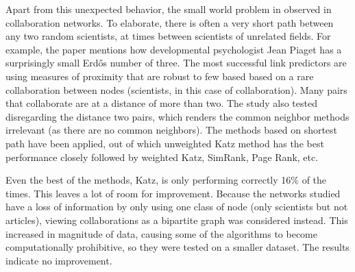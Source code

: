 \documentclass[11pt]{article}
\begin{document}
Apart from this unexpected behavior, the small world problem in observed in collaboration networks. To elaborate, there is often a very short path between any two random scientists, at times between scientists of unrelated fields. For example, the paper mentions how developmental psychologist Jean Piaget has a surprisingly small Erd\H{o}s number of three. The most successful link predictors are using measures of proximity that are robust to few based based on a rare collaboration between nodes (scientists, in this case of collaboration). Many pairs that collaborate are at a distance of more than two. The study also tested disregarding the distance two pairs, which renders the common neighbor methods irrelevant (as there are no common neighbors). The methods based on shortest path have been applied, out of which unweighted Katz method has the best performance closely followed by weighted Katz, SimRank, Page Rank, etc.\\
\par
Even the best of the methods, Katz, is only performing correctly 16\% of the times. This leaves a lot of room for improvement. Because the networks studied have a loss of information by only using one class of node (only scientists but not articles), viewing collaborations as a bipartite graph was considered instead. This increased in magnitude of data, causing some of the algorithms to become computationally prohibitive, so they were tested on a smaller dataset. The results indicate no improvement.
\end{document}
